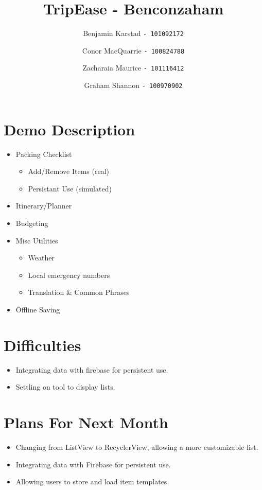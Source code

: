 \documentclass[12pt]{article}
\title{TripEase - Benconzaham}
\author{
Benjamin Karstad
\texttt{- 101092172}
\and
Conor MacQuarrie
\texttt{- 100824788}
\and
Zacharaia Maurice
\texttt{- 101116412}
\and
Graham Shannon
\texttt{- 100970902}
}
\begin{document}
	\maketitle

	\section*{Demo Description}

	\begin{itemize}

		\item{Packing Checklist}
		\begin{itemize}
			\item Add/Remove Items (real)
			\item Persistant Use (simulated)
		\end{itemize}

		\item{Itinerary/Planner}

		\item{Budgeting}

		\item{Misc Utilities}

		\begin{itemize}
			\item Weather
			\item Local emergency numbers
			\item Translation \& Common Phrases
		\end{itemize}

		\item{Offline Saving}

	\end{itemize}
	
	\section*{Difficulties}
	\begin{itemize}
		\item Integrating data with firebase for persistent use.
		\item Settling on tool to display lists.
	\end{itemize}
	
	\section*{Plans For Next Month}
	\begin{itemize}
		\item Changing from ListView to RecyclerView, allowing a more customizable list.
		\item Integrating data with Firebase for persistent use.
		\item Allowing users to store and load item templates.
	\end{itemize}
\end{document}
